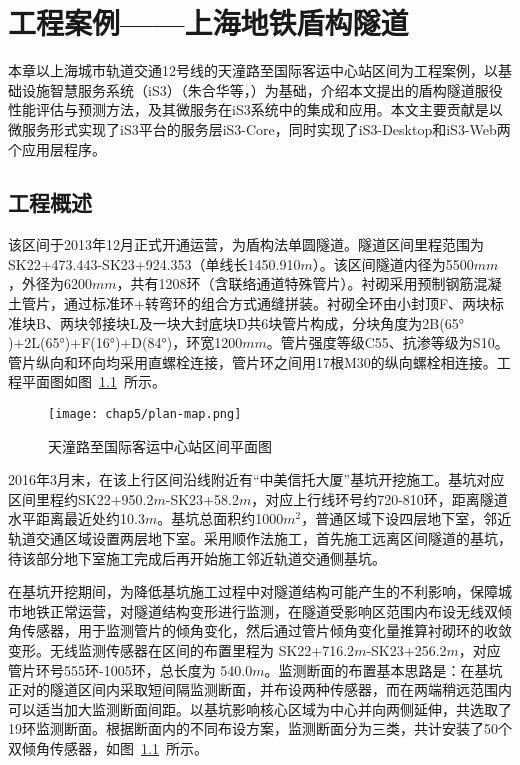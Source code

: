 \chapter{工程案例——上海地铁盾构隧道}
\label{chap:case}

本章以上海城市轨道交通12号线的天潼路至国际客运中心站区间为工程案例，以基础设施智慧服务系统（iS3）（朱合华等，\citeyear{朱合华2018智慧基础设施}）为基础，介绍本文提出的盾构隧道服役性能评估与预测方法，及其微服务在iS3系统中的集成和应用。本文主要贡献是以微服务形式实现了iS3平台的服务层iS3-Core，同时实现了iS3-Desktop和iS3-Web两个应用层程序。

\section{工程概述}

该区间于2013年12月正式开通运营，为盾构法单圆隧道。隧道区间里程范围为SK22+473.443-SK23+924.353（单线长1450.910$m$）。该区间隧道内径为5500$mm$，外径为6200$mm$，共有1208环（含联络通道特殊管片）。衬砌采用预制钢筋混凝土管片，通过标准环+转弯环的组合方式通缝拼装。衬砌全环由小封顶F、两块标准块B、两块邻接块L及一块大封底块D共6块管片构成，分块角度为2B(65$°$)+2L(65$°$)+F(16$°$)+D(84$°$)，环宽1200$mm$。管片强度等级C55、抗渗等级为S10。管片纵向和环向均采用直螺栓连接，管片环之间用17根M30的纵向螺栓相连接。工程平面图如图~\ref{fig:天潼路至国际客运中心站区间平面图}~所示。

\begin{figure}[htb!]
    \centering
    \texttt{[image: chap5/plan-map.png]}
    \caption{天潼路至国际客运中心站区间平面图}
    \label{fig:天潼路至国际客运中心站区间平面图}
\end{figure}

2016年3月末，在该上行区间沿线附近有“中美信托大厦”基坑开挖施工。基坑对应区间里程约SK22+950.2$m$-SK23+58.2$m$，对应上行线环号约720-810环，距离隧道水平距离最近处约10.3$m$。基坑总面积约1000$m^2$，普通区域下设四层地下室，邻近轨道交通区域设置两层地下室。采用顺作法施工，首先施工远离区间隧道的基坑，待该部分地下室施工完成后再开始施工邻近轨道交通侧基坑。

在基坑开挖期间，为降低基坑施工过程中对隧道结构可能产生的不利影响，保障城市地铁正常运营，对隧道结构变形进行监测，在隧道受影响区范围内布设无线双倾角传感器，用于监测管片的倾角变化，然后通过管片倾角变化量推算衬砌环的收敛变形。无线监测传感器在区间的布置里程为 SK22+716.2$m$-SK23+256.2$m$，对应管片环号555环-1005环，总长度为 540.0$m$。监测断面的布置基本思路是：在基坑正对的隧道区间内采取短间隔监测断面，并布设两种传感器，而在两端稍远范围内可以适当加大监测断面间距。以基坑影响核心区域为中心并向两侧延伸，共选取了19环监测断面。根据断面内的不同布设方案，监测断面分为三类，共计安装了50个双倾角传感器，如图~\ref{fig:天潼路至国际客运中心站区间平面图}~所示。

